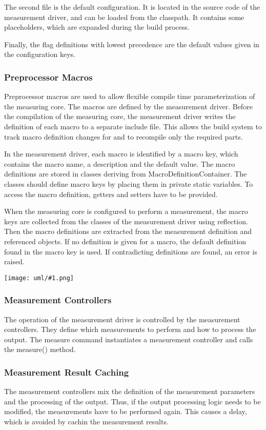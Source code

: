 \documentclass[a4paper,12pt]{article}
\newcommand{\umlDiagram}[1]{\begin{center}\texttt{[image: uml/\#1.png]}\end{center}}
\begin{document}
The second file is the default configuration. It is located in the source code of the measurement driver, and can be loaded from the classpath. It contains some placeholders, which are expanded during the build process.

Finally, the flag definitions with lowest precedence are the default values given in the configuration keys.

\subsubsection{Preprocessor Macros}
Preprocessor macros are used to allow flexible compile time parameterization of the measuring core. The macros are defined by the measurement driver. Before the compilation of the measuring core, the measurement driver writes the definition of each macro to a separate include file. This allows the build system to track macro definition changes for and to recompile only the required parts.

In the measurement driver, each macro is identified by a macro key, which contains the macro name, a description and the default value. The macro definitions are stored in classes deriving from MacroDefinitionContainer. The classes should define macro keys by placing them in private static variables. To access the macro definition, getters and setters have to be provided. 

When the measuring core is configured to perform a measurement, the macro keys are collected from the classes of the measurement driver using reflection. Then the macro definitions are extracted from the measurement definition and referenced objects. If no definition is given for a macro, the default definition found in the macro key is used. If contradicting definitions are found, an error is raised.

\umlDiagram{MacroDefinitions}

\subsubsection{Measurement Controllers}
The operation of the measurement driver is controlled by the measurement controllers. They define which measurements to perform and how to process the output. The measure command instantiates a measurement controller and calls the measure() method.

\subsubsection{Measurement Result Caching}
The measurement controllers mix the definition of the measurement parameters and the processing of the output. Thus, if the output processing logic needs to be modified, the measurements have to be performed again. This causes a delay, which is avoided by cachin the measurement results. 
\end{document}
